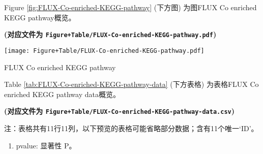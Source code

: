 \documentclass[
]{article}
\providecommand{\tightlist}{%
  \setlength{\itemsep}{0pt}\setlength{\parskip}{0pt}}
\begin{document}
Figure \ref{fig:FLUX-Co-enriched-KEGG-pathway} (下方图) 为图FLUX Co enriched KEGG pathway概览。

\textbf{(对应文件为 \texttt{Figure+Table/FLUX-Co-enriched-KEGG-pathway.pdf})}

\def\@captype{figure}
\begin{center}
\texttt{[image: Figure+Table/FLUX-Co-enriched-KEGG-pathway.pdf]}
\caption{FLUX Co enriched KEGG pathway}\label{fig:FLUX-Co-enriched-KEGG-pathway}
\end{center}

\begin{center}\vspace{1.5cm}\end{center}

\begin{center}\vspace{1.5cm}\end{center}

Table \ref{tab:FLUX-Co-enriched-KEGG-pathway-data} (下方表格) 为表格FLUX Co enriched KEGG pathway data概览。

\textbf{(对应文件为 \texttt{Figure+Table/FLUX-Co-enriched-KEGG-pathway-data.csv})}

\begin{center}\begin{tcolorbox}[colback=gray!10, colframe=gray!50, width=0.9\linewidth, arc=1mm, boxrule=0.5pt]注：表格共有11行11列，以下预览的表格可能省略部分数据；含有11个唯一`ID'。
\end{tcolorbox}
\end{center}
\begin{center}\begin{tcolorbox}[colback=gray!10, colframe=gray!50, width=0.9\linewidth, arc=1mm, boxrule=0.5pt]\begin{enumerate}\tightlist
\item pvalue:  显著性 P。
\end{enumerate}\end{tcolorbox}
\end{center}
\end{document}
